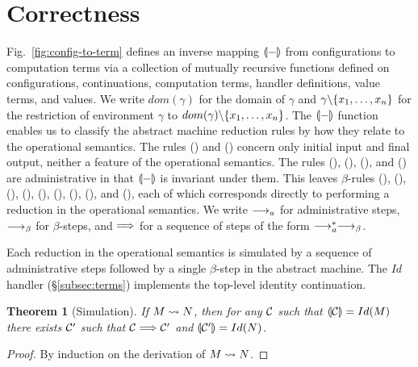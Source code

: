 \documentclass[12pt,phd,lfcs,twoside,openright,logo,leftchapter,normalheadings]{infthesis}
\theoremstyle{plain}
\newtheorem{theorem}{Theorem}[chapter]
\theoremstyle{definition}
\begin{document}
\section{Correctness}
\label{subsec:machine-correctness}

Fig.~\ref{fig:config-to-term} defines an inverse mapping $\llparenthesis - \rrparenthesis$
from configurations to computation terms via a collection of mutually
recursive functions defined on configurations, continuations,
computation terms, handler definitions, value terms, and values.
%
We write $dom(\gamma)$ for the domain of $\gamma$ and $\gamma \backslash
\{x_1, \dots, x_n\}$ for the restriction of environment $\gamma$ to
$dom(\gamma) \backslash \{x_1, \dots, x_n\}$.
%
The $\llparenthesis - \rrparenthesis$ function enables us to classify the abstract machine
reduction rules by how they relate to the operational
semantics.
%
The rules () and () concern only initial
input and final output, neither a feature of the operational
semantics.
%
The rules (), (), (),
and () are administrative in that $\llparenthesis - \rrparenthesis$ is invariant
under them.
%
This leaves $\beta$-rules (), (),
(), (), (), (),
(), (), and (),
each of which corresponds directly to performing a reduction in the
operational semantics.
%
We write $\longrightarrow_a$ for administrative steps, $\longrightarrow_\beta$ for
$\beta$-steps, and $\Longrightarrow$ for a sequence of steps of the form
$\longrightarrow_a^* \longrightarrow_\beta$.

Each reduction in the operational semantics is simulated by a sequence
of administrative steps followed by a single $\beta$-step in the
abstract machine. The $Id$ handler (\S\ref{subsec:terms})
implements the top-level identity continuation.
\\
\begin{theorem}[Simulation]
\label{lem:simulation}
If $M \leadsto N$, then for any $\mathcal{C}$ such that $\llparenthesis \mathcal{C} \rrparenthesis =
Id(M)$ there exists $\mathcal{C}'$ such that $\mathcal{C} \Longrightarrow \mathcal{C}'$ and
$\llparenthesis \mathcal{C}' \rrparenthesis = Id(N)$.
\end{theorem}

\begin{proof}
By induction on the derivation of $M \leadsto N$.
\end{proof}
\end{document}

